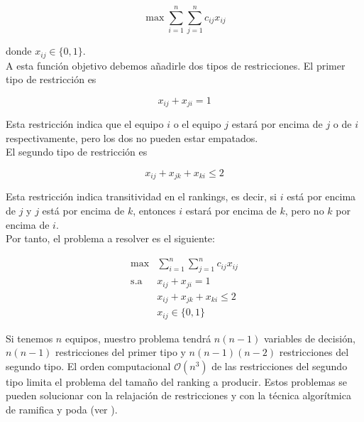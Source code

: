 \begin{equation}
\max \sum_{i=1}^{n} \sum_{j=1}^{n} c_{ij} x_{ij}
\end{equation}

donde $x_{ij} \in \{0,1\}$.\\

A esta función objetivo debemos añadirle dos tipos de restricciones. El primer tipo de restricción es

\begin{equation}
x_{ij} + x_{ji} = 1
\end{equation}

Esta restricción indica que el equipo $i$ o el equipo $j$ estará por encima de $j$ o de $i$ respectivamente, pero los dos no pueden estar empatados.\\

El segundo tipo de restricción es 

\begin{equation}
x_{ij} + x_{jk} + x_{ki} \leq 2
\end{equation}

Esta restricción indica transitividad en el rankings, es decir, si $i$ está por encima de $j$ y $j$ está por encima de $k$, entonces $i$ estará por encima de $k$, pero no $k$ por encima de $i$.\\

Por tanto, el problema a resolver es el siguiente:

\begin{equation}
\begin{array}{rl}
\max         & \sum\limits_{i=1}^{n} \sum\limits_{j=1}^{n} c_{ij} x_{ij}\\
\mathrm{s.a} & x_{ij} + x_{ji} = 1\\
             & x_{ij} + x_{jk} + x_{ki} \leq 2\\
             & x_{ij} \in \{0,1\}
\end{array}
\end{equation}

Si tenemos $n$ equipos, nuestro problema tendrá $n(n-1)$ variables de decisión, $n(n-1)$ restricciones del primer tipo y $n(n-1)(n-2)$ restricciones del segundo tipo. El orden computacional $\mathcal{O}(n^3)$ de las restricciones del segundo tipo limita el problema del tamaño del ranking a producir. Estos problemas se pueden solucionar con la relajación de restricciones y con la técnica algorítmica de ramifica y poda (ver \cite[pág 190-192]{langville2012s}).

